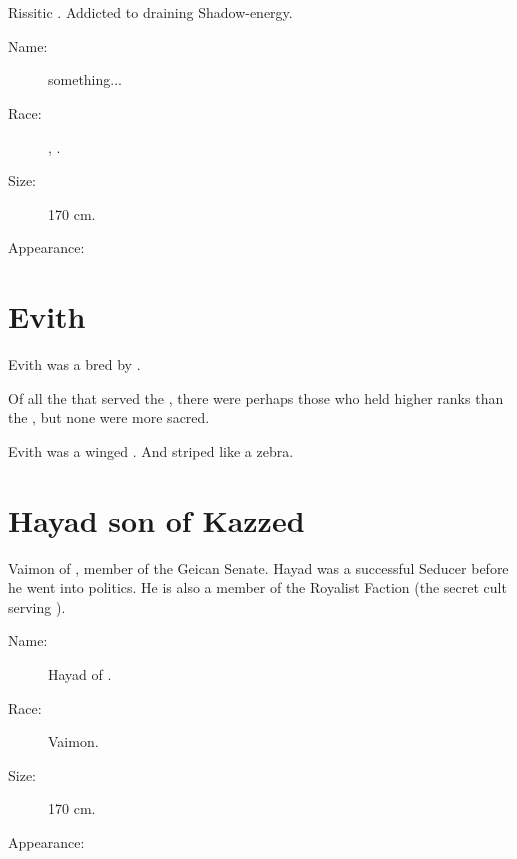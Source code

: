 \section{\Dzerezdin}
Rissitic \Ashenoch{}. Addicted to draining Shadow-energy. 

\begin{description}
  \item[Name:] \Dzerezdin{} something... 
  \item[Race:] \Human, \Ashenoch{}. 
  \item[Size:] 170 cm. 
  \item[Appearance:] 
\end{description}
















\section{Evith}
Evith was a  bred by . 

Of all the \humans{} that served the \resphain, there were perhaps those who held higher ranks than the \naorim, but none were more sacred. 

Evith was a winged . 
And striped like a zebra. 
















\section{Hayad son of Kazzed}
Vaimon of \ClanGeican, member of the Geican Senate. Hayad was a successful Seducer before he went into politics. He is also a member of the Royalist Faction (the secret cult serving \Belzir). 

\begin{description}
  \item[Name:] Hayad \Freid of \ClanGeican. 
  \item[Race:] Vaimon. 
  \item[Size:] 170 cm. 
  \item[Appearance:] 
\end{description}















